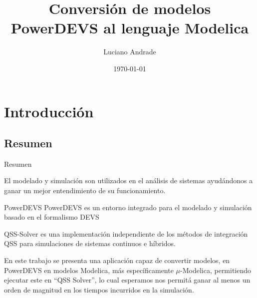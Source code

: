 \documentclass[10pt,presentation]{beamer}
\title{Conversión de modelos PowerDEVS al lenguaje Modelica}
\author{Luciano Andrade}
\institute[UNR] 
{
Universidad Nacional de Rosario\\
\medskip
\textit{andrade.luciano@gmail.com}
}
\date{\today}
\newcommand{\quotes}[1]{``#1''}
\begin{document}
\begin{frame}
\titlepage %
\end{frame}

\section{Introducción}
	\subsection{Resumen}
\begin{frame}{Resumen}
\begin{block}{El modelado y simulación}
son utilizados en el análisis de sistemas  ayudándonos a ganar un mejor entendimiento de su funcionamiento. 
\end{block}

\begin{block}{PowerDEVS}
PowerDEVS es un entorno integrado para el modelado y simulación basado en el formalismo DEVS
\end{block}

\begin{block}{QSS-Solver}
es una implementación independiente de los métodos de integración QSS para simulaciones de sistemas continuos e híbridos. 
\end{block}


\begin{block}{En este trabajo}
se presenta una aplicación capaz de convertir modelos, en PowerDEVS en modelos Modelica, más específicamente $\mu$-Modelica, permitiendo ejecutar este en \quotes{QSS Solver}, lo cual esperamos nos permitá ganar al menos un orden de magnitud en los tiempos incurridos en la simulación.
\end{block}
\end{frame}
\end{document}
